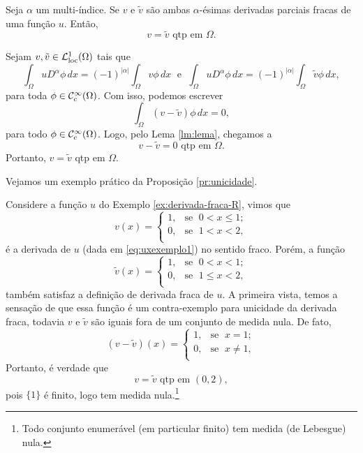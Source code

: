 \begin{pbox} \label{pr:unicidade}
    Seja $\alpha$ um multi-índice. Se $v$ e $\tilde v$ são ambas $\alpha$-ésimas derivadas parciais fracas de uma função $u$.
    Então,
    \[
        v = \tilde v \text{ qtp em } \Omega.
    \]
\end{pbox}
\begin{prf}
    Sejam $v, \tilde v \in \mathcal{L}^1_{\mathrm{loc}}(\Omega)$ tais que
    \[
        \int_\Omega u D^\alpha \phi \,dx = (-1)^{|\alpha|} \int_\Omega v \phi \,dx \;\text{ e }\; \int_\Omega u D^\alpha \phi \, dx= (-1)^{|\alpha|}\int_\Omega \tilde v \phi \,dx,
    \]
    para toda $\phi \in \mathcal{C}^\infty_c(\Omega)$. Com isso, podemos escrever
    \[
        \int_\Omega (v - \tilde v) \phi \, dx = 0,
    \]
    para todo $\phi \in \mathcal{C}^{\infty}_c(\Omega)$.
    Logo, pelo Lema \ref{lm:lema}, chegamos a
    \[
        v - \tilde v = 0 \text{ qtp em } \Omega.
    \]
    Portanto, $v = \tilde v$ qtp em $\Omega$.
\end{prf}

Vejamos um exemplo prático da Proposição \ref{pr:unicidade}.

\begin{ex}
    Considere a função $u$ do Exemplo \ref{ex:derivada-fraca-R}, vimos que
    \[
        v(x) = \left\{
            \begin{array}{rl}
                1, & \!\text{se }\; 0 < x \leqslant 1;\\
                0, & \!\text{se }\; 1 < x < 2,\\
            \end{array}
        \right.
    \]
    é a derivada de $u$ (dada em \ref{eq:uxexemplo1}) no sentido fraco.
    Porém, a função
    \[
        \tilde v(x) = \left\{
            \begin{array}{rl}
                1, & \text{se }\; 0 < x < 1;\\
                0, & \text{se }\; 1 \leqslant x < 2,\\
            \end{array}
        \right.
    \]
    também satisfaz a definição de derivada fraca de $u$.
    A primeira vista, temos a sensação de que essa função é um contra-exemplo para unicidade da derivada fraca, todavia $v$ e $\tilde v$ são iguais fora de um conjunto de medida nula.
    De fato,
    \[
        (v - \tilde v)(x) = \left\{
            \begin{array}{rl}
                1, & \text{se }\; x = 1;\\
                0, & \text{se }\; x \neq 1,\\
            \end{array}
        \right.
    \]
    Portanto, é verdade que
    \[
        v = \tilde v \text{ qtp em } (0,2),
    \]
    pois $\{1\}$ é finito, logo tem medida nula.\footnote{Todo conjunto enumerável (em particular finito) tem medida (de Lebesgue) nula.}
\end{ex}

